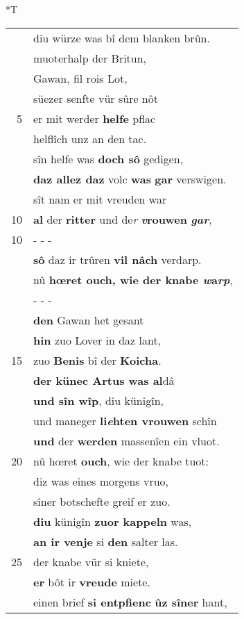 \documentclass[8pt,a4paper,notitlepage]{article}
\begin{document}
\begin{table}[ht]
\begin{minipage}[t]{0.5\linewidth}
\small
\begin{center}*T
\end{center}
\begin{tabular}{rl}
 & diu würze was bî dem blanken brûn.\\ 
 & muoterhalp der Britun,\\ 
 & Gawan, fil rois Lot,\\ 
 & süezer senfte vür sûre nôt\\ 
5 & er mit werder \textbf{helfe} pflac\\ 
 & helflîch unz an den tac.\\ 
 & sîn helfe was \textbf{doch sô} gedigen,\\ 
 & \textbf{daz allez daz} volc \textbf{was} \textbf{gar} verswigen.\\ 
 & sît nam er mit vreuden war\\ 
10 & \textbf{al} der \textbf{ritter} und de\textit{r} \textbf{\textit{v}rouwen} \textit{\textbf{gar}},\\ 
10 & \multicolumn{1}{l}{ - - - }\\ 
 & \textbf{sô} daz ir trûren \textbf{vil nâch} verdarp.\\ 
 & nû \textbf{hœret ouch, wie der knabe \textit{w}a\textit{rp}},\\ 
 & \multicolumn{1}{l}{ - - - }\\ 
 & \textbf{den} Gawan het gesant\\ 
 & \textbf{hin} zuo Lover in daz lant,\\ 
15 & zuo \textbf{Benis} bî der \textbf{Koicha}.\\ 
 & \textbf{der künec Artus was al}dâ\\ 
 & \textbf{und sîn wîp}, diu künigîn,\\ 
 & und maneger \textbf{li\textit{e}hten vrouwen} schîn\\ 
 & \textbf{und} der \textbf{werden} massenîen ein vluot.\\ 
20 & nû hœret \textbf{ouch}, wie der knabe tuot:\\ 
 & diz was eines morgens vruo,\\ 
 & sîner botschefte greif er zuo.\\ 
 & \textbf{diu} künigîn \textbf{zuor kappeln} was,\\ 
 & \textbf{an ir venje} si \textbf{den} salter las.\\ 
25 & der knabe vür si kniete,\\ 
 & \textbf{er} bôt ir \textbf{vreude} miete.\\ 
 & einen brief \textbf{si entpfienc} \textbf{ûz sîner} hant,\\ 

\end{tabular}
\end{minipage}
\end{table}
\end{document}
